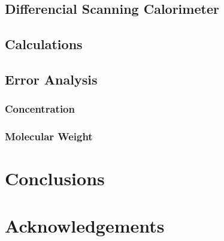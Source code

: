 \documentclass{article}
\begin{document}
\begin{multicols}{2}
            \subsection{Differencial Scanning Calorimeter}
            \subsection{Calculations}
            \subsection{Error Analysis}
                \subsubsection{Concentration}
                \subsubsection{Molecular Weight}
        \section{Conclusions}
        \section{Acknowledgements}
        
        
    \end{multicols}
\end{document}

